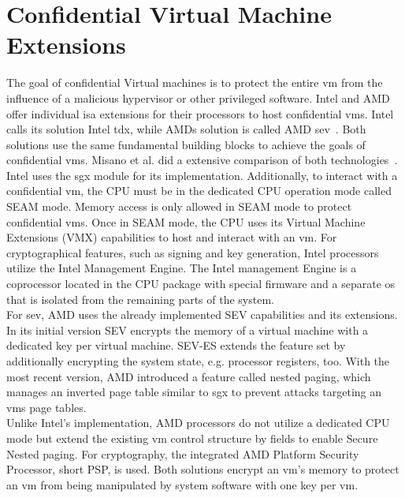 \section{Confidential Virtual Machine Extensions}
\label{section:20:confidential_vms}
The goal of confidential Virtual machines is to protect the entire \gls{vm} from
the influence of a malicious hypervisor or other privileged software. Intel and
AMD offer individual \gls{isa} extensions for their processors to host
confidential \glspl{vm}. Intel calls its solution Intel \gls{tdx}, while AMDs
solution is called AMD \gls{sev}~\cite{tdx_whitepaper,kaplan_amd_2020}. Both
solutions use the same fundamental building blocks to achieve the goals of
confidential \glspl{vm}. Misano et al. did a extensive comparison of both
technologies~\cite{misono_confidential_2024}. Intel uses the \gls{sgx} module
for its implementation. Additionally, to interact with a confidential \gls{vm},
the CPU must be in the dedicated CPU operation mode called SEAM mode. Memory
access is only allowed in SEAM mode to protect confidential \glspl{vm}. Once in
SEAM mode, the CPU uses its Virtual Machine Extensions (VMX) capabilities to
host and interact with an \gls{vm}. For cryptographical features, such as
signing and key generation, Intel processors utilize the Intel Management
Engine. The Intel management Engine is a coprocessor located in the CPU package
with special firmware and a separate \gls{os} that is isolated from the
remaining parts of the system.\\

For \gls{sev}, AMD uses the already implemented SEV capabilities and its
extensions. In its initial version SEV encrypts the memory of a virtual machine
with a dedicated key per virtual machine. SEV-ES extends the feature set by
additionally encrypting the system state, e.g. processor registers, too. With
the most recent version, AMD introduced a feature called nested paging, which
manages an inverted page table similar to \gls{sgx} to prevent attacks targeting
an \gls{vm}s page tables.\\

Unlike Intel's implementation, AMD processors do not utilize a dedicated CPU
mode but extend the existing \gls{vm} control structure by fields to enable
Secure Nested paging. For cryptography, the integrated AMD Platform Security
Processor, short PSP, is used. Both solutions encrypt an \gls{vm}'s memory to
protect an \gls{vm} from being manipulated by system software with one key per
\gls{vm}.\\

